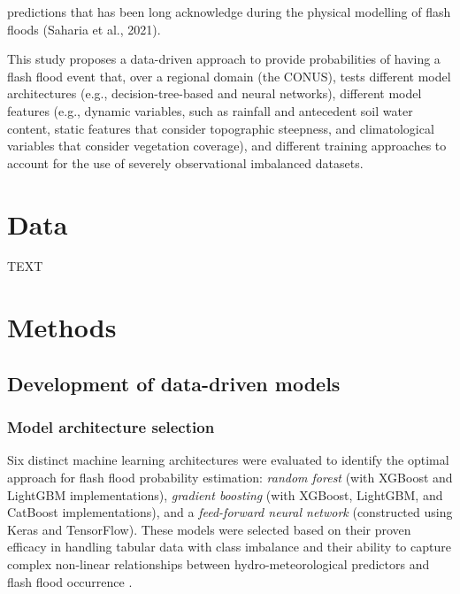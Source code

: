 \documentclass[nhess, manuscript]{copernicus}
\begin{document}
predictions that has been long acknowledge during the physical modelling of flash floods (Saharia et al., 2021).

This study proposes a data-driven approach to provide probabilities of having a flash flood event that, over a regional domain (the CONUS), tests different model architectures (e.g., decision-tree-based and neural networks), different model features (e.g., dynamic variables,  such as rainfall and antecedent soil water content, static features that consider topographic steepness, and climatological variables that consider vegetation coverage), and different training approaches to account for the use of severely observational imbalanced datasets.

\section{Data}
TEXT


\section{Methods}

\subsection{Development of data-driven models}

\subsubsection{Model architecture selection}

Six distinct machine learning architectures were evaluated to identify the optimal approach for flash flood probability estimation: \textit{random forest} (with XGBoost and LightGBM implementations), \textit{gradient boosting} (with XGBoost, LightGBM, and CatBoost implementations), and a \textit{feed-forward neural network} (constructed using Keras and TensorFlow). These models were selected based on their proven efficacy in handling tabular data with class imbalance and their ability to capture complex non-linear relationships between hydro-meteorological predictors and flash flood occurrence \citep{Shwartz-Ziv_2022}.
\end{document}
